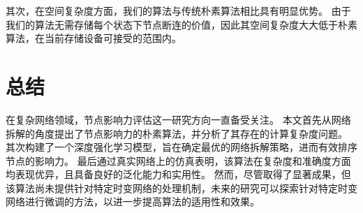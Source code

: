 \documentclass[twocolumn]{morningstar}
\begin{document}
其次，在空间复杂度方面，我们的算法与传统朴素算法相比具有明显优势。
由于我们的算法无需存储每个状态下节点断连的价值，因此其空间复杂度大大低于朴素算法，在当前存储设备可接受的范围内。


\section{总结}\label{sec:Conclusion}

在复杂网络领域，节点影响力评估这一研究方向一直备受关注。
本文首先从网络拆解的角度提出了节点影响力的朴素算法，并分析了其存在的计算复杂度问题。
其次构建了一个深度强化学习模型，旨在确定最优的网络拆解策略，进而有效排序节点的影响力。
最后通过真实网络上的仿真表明，该算法在复杂度和准确度方面均表现优异，且具备良好的泛化能力和实用性。
然而，尽管取得了显著成果，但该算法尚未提供针对特定时变网络的处理机制，未来的研究可以探索针对特定时变网络进行微调的方法，以进一步提高算法的适用性和效果。

\end{document}

